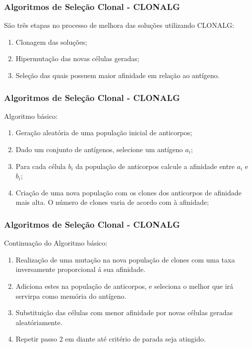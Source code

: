 \documentclass{beamer}
\begin{document}
\begin{frame}
    \frametitle{Algoritmos de Seleção Clonal - CLONALG}
    
    São três etapas no processo de melhora das soluções utilizando CLONALG:
    
    \begin{enumerate}
        \item Clonagem das soluções;
        \item Hipermutação das novas células geradas;
        \item Seleção das quais possuem maior afinidade em relação ao antígeno. 
    \end{enumerate}
\end{frame}

\begin{frame}
    \frametitle{Algoritmos de Seleção Clonal - CLONALG}
    
    Algoritmo básico\cite{decastro2002}:
    
    \begin{enumerate}
        \item Geração aleatória de uma população inicial de anticorpos;
        \item Dado um conjunto de antígenos, selecione um antígeno $a_{i}$;
        \item Para cada célula $b_{i}$ da população de anticorpos calcule a afinidade entre $a_{i}$ e $b_{i}$;
        \item Criação de uma nova população com os clones dos anticorpos de afinidade mais alta. O número de clones varia de acordo com à afinidade;
        
    \end{enumerate}
\end{frame}

\begin{frame}
    \frametitle{Algoritmos de Seleção Clonal - CLONALG}
    
    Continuação do Algoritmo básico:
    
    \begin{enumerate}
        \item Realização de uma mutação na nova população de clones com uma taxa inversamente proporcional á sua afinidade.
        \item Adiciona estes na população de anticorpos, e seleciona o melhor que irá servirpa como memória do antígeno.
        \item Substituição das células com menor afinidade por novas células geradas aleatóriamente.
        \item Repetir passo 2 em diante até critério de parada seja atingido.
        
    \end{enumerate}
\end{frame}
\end{document}
